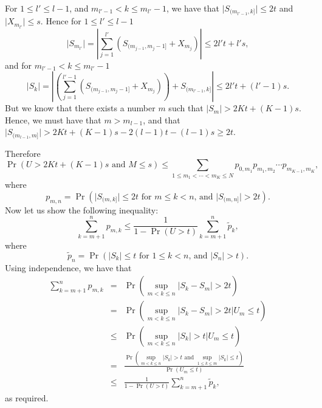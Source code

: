 \documentclass[12pt]{article}
\newcommand{\modo}[1]{{\left|#1\right|}}
\newcommand{\smodo}[1]{{\mathopen|#1\mathclose|}}
\begin{document}
For $1 \le l' \le l-1$, and $m_{l'-1} < k \le m_{l'}-1$, we have that
$\smodo{S_{(m_{l'-1},k]}} \le 2t$ and $\smodo{X_{m_{l'}}} \le s$.  Hence
for $1 \le l' \le l-1$
$$ \smodo{S_{m_{l'}}} 
   =
   \modo{ \sum_{j=1}^{l'} (S_{(m_{j-1},m_j-1]} + X_{m_j}) }
   \le
   2 l' t + l's,$$
and for $m_{l'-1} < k \le m_{l'}-1$
$$ \smodo{S_{k}} 
   =
   \modo{ \left(\sum_{j=1}^{l'-1} (S_{(m_{j-1},m_j-1]} + X_{m_j})\right)
          + S_{(m_{l'-1},k]} }
   \le
   2 l' t + (l'-1)s.$$
But we know that there exists a number $m$ such that
$\smodo{S_m} > 2K t+(K-1)s$. Hence, we must 
have that $m > m_{l-1}$, and that 
$\smodo{S_{(m_{l-1},m]}} > 2K t + (K-1)s - 2(l-1)t - (l-1)s \ge 2t$.

Therefore 
$$ \Pr( U > 2K t+(K-1)s \text{ and } M \le s) \le \sum_{1 \le m_1
< \cdots < m_{K} \le N}p_{0,m_1} p_{m_1,m_2} \cdots p_{m_{K-1},m_K}
,$$ where $$ p_{m,n} = \Pr(\text{$\smodo{S_{(m,k]}} \le 2t$ for $m \le
k < n$, and $\smodo{S_{(m,n]}} > 2t$}) .$$ 
Now let us show the following inequality: 
$$ \sum_{k=m+1}^n p_{m,k}
   \le
   {\frac{1}{ 1 - \Pr(U>t)}}\sum_{k=m+1}^n \tilde p_k ,$$ 
where 
$$ \tilde p_n = \Pr(\text{$\smodo{S_k} \le t$ for $1 \le k < n$, and 
   $\smodo{S_n} > t$}) .$$ 
Using independence, we have that 
\begin{eqnarray*}
  \sum_{k=m+1}^n p_{m,k}
  &=&\Pr(\sup_{m < k \le n} \smodo{S_k - S_m} > 2t) \\ 
  &=&\Pr(\sup_{m < k \le n} \smodo{S_k - S_m} > 2t \big| U_m \le t) \\ 
  &\le& \Pr(\sup_{m < k \le n} \smodo{S_k} > t \big| U_m \le t) \\
  &=& {\frac{\Pr(\sup_{m<k\le n} \smodo{S_k} > t 
      \text{ and }\sup_{1 \le k \le m} \smodo{S_k} \le t)
      }{ \Pr(U_m \le t) }} \\ 
  &\le& {\frac{1}{ 1 - \! \Pr(U>t)}}\sum_{k=m+1}^n \tilde p_k ,
\end{eqnarray*} 
as required.
\end{document}
